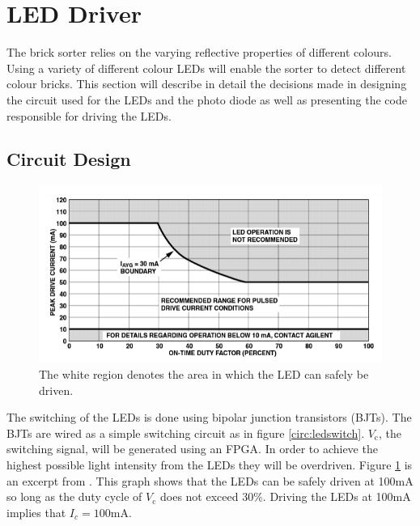 \section{LED Driver}
The brick sorter relies on the varying reflective properties of different colours. Using a variety of different colour LEDs will enable the sorter to detect different colour bricks. This section will describe in detail the decisions made in designing the circuit used for the LEDs and the photo diode as well as presenting the code responsible for driving the LEDs. 

\subsection{Circuit Design}
\begin{figure}[h!]
	\begin{center}
		\includegraphics[width=\linewidth]{images/overdrive}
	\end{center}
	\caption{The white region denotes the area in which the LED can safely be driven.}
	\label{fig:overdrive}
\end{figure}
The switching of the LEDs is done using bipolar junction transistors (BJTs). The BJTs are wired as a simple switching circuit as in figure \ref{circ:ledswitch}. $V_{\text{c}}$, the switching signal, will be generated using an FPGA.
In order to achieve the highest possible light intensity from the LEDs they will be overdriven. Figure \ref{fig:overdrive} is an excerpt from \cite{avago}. This graph shows that the LEDs can be safely driven at 100mA so long as the duty cycle of $V_{\text{c}}$ does not exceed 30\%. Driving the LEDs at 100mA implies that $I_c=100\text{mA}$. 

